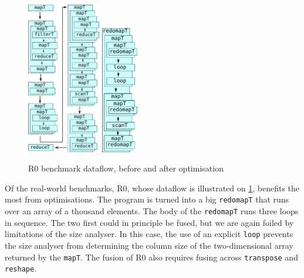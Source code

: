 \begin{figure}
\begin{center}
\includegraphics[width=3.2cm]{img/PricingLexiFi-unfused.pdf}
\hspace{1cm}
\includegraphics[width=1.6cm]{img/PricingLexiFi-fused.pdf}
\end{center}
\caption{R0 benchmark dataflow, before and after optimisation}
\label{fig:r0-dataflow}
\end{figure}

Of the real-world benchmarks, R0, whose dataflow is illustrated on
\cref{fig:r0-dataflow}, benefits the most from optimisations.  The
program is turned into a big \texttt{redomapT} that runs over an array
of a thousand elements.  The body of the \texttt{redomapT} runs three
loops in sequence.  The two first could in principle be fused, but we
are again foiled by limitations of the size analyser.  In this case,
the use of an explicit \texttt{loop} prevents the size analyser from
determining the column size of the two-dimensional array returned by
the \texttt{mapT}.  The fusion of R0 also requires fusing across
\texttt{transpose} and \texttt{reshape}.

